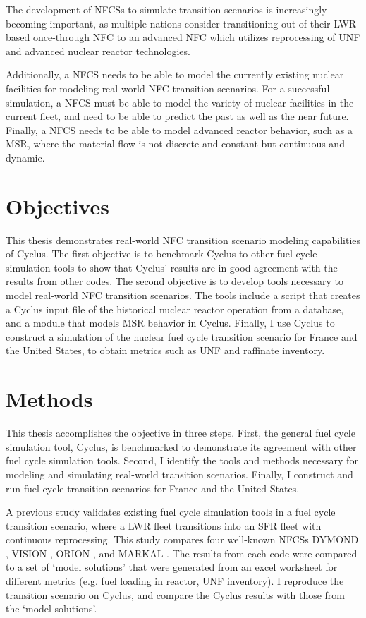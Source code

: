 The development of \glspl{NFCS}
to simulate transition scenarios
is increasingly becoming important, as multiple nations
consider transitioning out of their \gls{LWR} based once-through \gls{NFC}
to an advanced \gls{NFC} which utilizes reprocessing
of \gls{UNF} and advanced nuclear reactor technologies.

Additionally, a \gls{NFCS} needs to be able to model the currently
existing nuclear facilities for modeling real-world \gls{NFC} transition
scenarios. 
For a successful simulation, a \gls{NFCS} must be able to 
model the variety of nuclear facilities in the current fleet,
and need to be able to predict the past as well as the near future.
Finally, a \gls{NFCS} needs to be able to model advanced reactor
behavior, such as a \gls{MSR}, where the material flow is not
discrete and constant but continuous and dynamic.


\section{Objectives}

This thesis demonstrates real-world \gls{NFC} transition
scenario modeling capabilities of Cyclus. The first objective is
to benchmark Cyclus to other fuel cycle simulation tools to
show that Cyclus' results are in good agreement with the results
from other codes. The second objective is to develop tools
necessary to model real-world \gls{NFC} transition
scenarios. The tools include a script that creates a Cyclus
input file of the historical nuclear reactor operation from
a database, and a module that models \gls{MSR} behavior in Cyclus.
Finally, I use Cyclus to construct a simulation of the nuclear
fuel cycle transition scenario for France and the United States,
to obtain metrics such as \gls{UNF} and raffinate inventory.


\section{Methods}
This thesis accomplishes the objective in three steps. First,
the general fuel cycle simulation tool, Cyclus, is benchmarked
to demonstrate its agreement with other fuel cycle simulation
tools. Second, I identify the tools and methods necessary
for modeling and simulating real-world transition scenarios.
Finally, I construct and run fuel cycle transition scenarios
for France and the United States.

A previous study \cite{feng_standardized_2016} validates existing fuel cycle
simulation tools in a fuel cycle transition scenario, where a \gls{LWR} fleet
transitions into an \gls{SFR} fleet with continuous reprocessing. This 
study compares four well-known \glspl{NFCS}
DYMOND \cite{yacout_modeling_2005},
VISION \cite{jacobson_verifiable_2010},
ORION \cite{gregg_analysis_2012}, and
MARKAL \cite{shay_epa_2006}. The results from each code were
compared to a set of `model solutions' that were generated
from an excel worksheet for different metrics (e.g. fuel loading
in reactor, \gls{UNF} inventory). I reproduce the transition
scenario on Cyclus, and compare the Cyclus results with those
from the `model solutions'.

